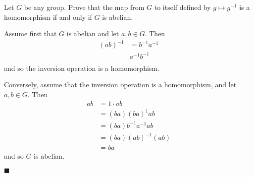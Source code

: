 \documentclass[12pt]{article}
\renewcommand{\qed}{\hfill$\blacksquare$}
\renewenvironment{proof}{\begin{addmargin}[1em]{0em}\begin{newproof}}{\end{newproof}\end{addmargin}\qed}
\newenvironment{problem}[2][Exercise]{\begin{trivlist}
\item[\hskip \labelsep {\bfseries #1}\hskip \labelsep {\bfseries #2.}]}{\end{trivlist}}
\begin{document}
\begin{problem}{1.6.17}
Let $G$ be any group. Prove that the map from $G$ to itself defined by $g\mapsto g^{-1}$ is a homomorphism if and only if $G$ is abelian.
\end{problem}
\begin{proof}
Assume first that $G$ is abelian and let $a,b\in G$. Then
\begin{equation*}
\begin{split}
    \left(ab\right)^{-1} & = b^{-1}a^{-1} \\
    & a^{-1}b^{-1} \\
\end{split}
\end{equation*}
and so the inversion operation is a homomorphism.

Conversely, assume that the inversion operation is a homomorphism, and let $a,b\in G$. Then
\begin{equation*}
    \begin{split}
        ab & = 1\cdot ab \\
        & = \left(ba\right)\left(ba\right)^1 ab \\
        & = \left(ba\right)b^{-1}a^{-1} ab \\
        & = \left(ba\right)\left(ab\right)^{-1}\left(ab\right) \\
        & = ba
    \end{split}
\end{equation*}
and so $G$ is abelian.
\end{proof}
\end{document}
